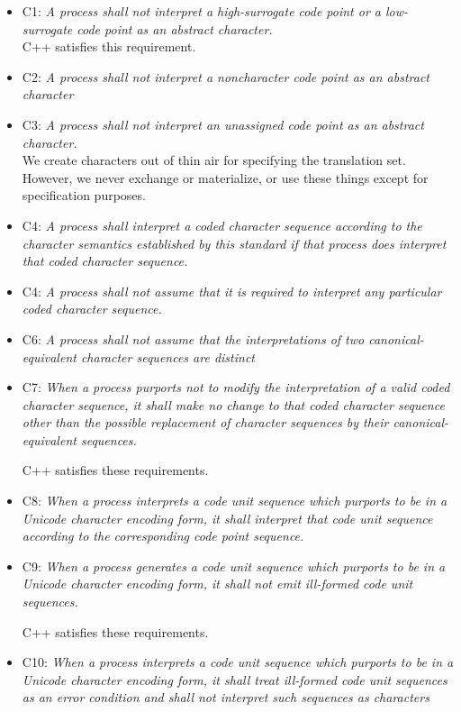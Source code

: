 \documentclass{wg21}
\begin{document}
\begin{itemize}
    \item C1: \emph{A process shall not interpret a high-surrogate code point or a low-surrogate code point as an abstract character.}\\
    C++ satisfies this requirement.

    \item C2: \emph{A process shall not interpret a noncharacter code point as an abstract character}
    \item C3: \emph{A process shall not interpret an unassigned code point as an abstract character.}\\

    We create characters out of thin air for specifying the translation set.
    However, we never exchange or materialize, or use these things except for specification purposes.

    \item C4: \emph{A process shall interpret a coded character sequence according to the character semantics established by this standard if that process does interpret that coded character sequence.}
    \item C4: \emph{A process shall not assume that it is required to interpret any particular coded character sequence.}
    \item C6: \emph{A process shall not assume that the interpretations of two canonical-equivalent character sequences are distinct}
    \item C7: \emph{When a process purports not to modify the interpretation of a valid coded character
        sequence, it shall make no change to that coded character sequence other than the possible replacement of character sequences by their canonical-equivalent sequences.}

    C++ satisfies these requirements.

    \item C8: \emph{When a process interprets a code unit sequence which purports to be in a Unicode
        character encoding form, it shall interpret that code unit sequence according to the
        corresponding code point sequence.}
    \item C9: \emph{When a process generates a code unit sequence which purports to be in a Unicode
        character encoding form, it shall not emit ill-formed code unit sequences.}

    C++ satisfies these requirements.

    \item C10: \emph{When a process interprets a code unit sequence which purports to be in a Unicode
        character encoding form, it shall treat ill-formed code unit sequences as an error condition and shall not interpret such sequences as characters}


\end{itemize}
\end{document}
